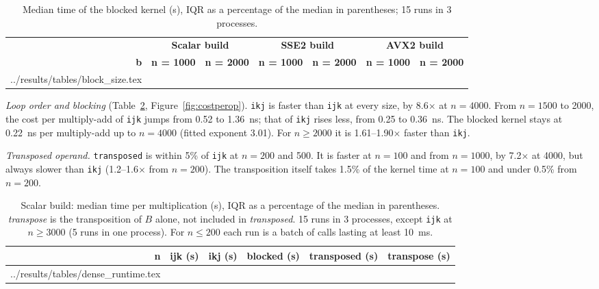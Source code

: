 \documentclass[11pt,a4paper]{article}
\makeatletter
\newcommand{\tableinput}[1]{\@@input #1 }
\makeatother
\begin{document}
\begin{table}[H]
\centering
\footnotesize
\setlength{\tabcolsep}{4pt}
\begin{tabular}{rllllll}
\toprule
& \multicolumn{2}{c}{\textbf{Scalar build}} & \multicolumn{2}{c}{\textbf{SSE2 build}} &
\multicolumn{2}{c}{\textbf{AVX2 build}} \\
\cmidrule(lr){2-3} \cmidrule(lr){4-5} \cmidrule(lr){6-7}
\textbf{b} & \textbf{n = 1000} & \textbf{n = 2000} & \textbf{n = 1000} & \textbf{n = 2000} &
\textbf{n = 1000} & \textbf{n = 2000} \\
\midrule
\tableinput{../results/tables/block_size.tex}
\bottomrule
\end{tabular}
\caption{Median time of the blocked kernel (s), IQR as a percentage of the median in
parentheses; 15 runs in 3 processes.}
\label{tab:blocksize}
\end{table}

\textit{Loop order and blocking} (Table~\ref{tab:dense}, Figure~\ref{fig:costperop}).
\texttt{ikj} is faster than \texttt{ijk} at every size, by 8.6$\times$ at $n = 4000$. From
$n = 1500$ to 2000, the cost per multiply-add of \texttt{ijk} jumps from 0.52 to 1.36~ns;
that of \texttt{ikj} rises less, from 0.25 to 0.36~ns. The blocked kernel stays at 0.22~ns
per multiply-add up to $n = 4000$ (fitted exponent 3.01). For $n \ge 2000$ it is
1.61--1.90$\times$ faster than \texttt{ikj}.

\textit{Transposed operand.} \texttt{transposed} is within 5\% of \texttt{ijk} at
$n = 200$ and 500. It is faster at $n = 100$ and from $n = 1000$, by 7.2$\times$ at 4000,
but always slower than \texttt{ikj} (1.2--1.6$\times$ from $n = 200$). The transposition
itself takes 1.5\% of the kernel time at $n = 100$ and under 0.5\% from $n = 200$.

\begin{table}[H]
\centering
\footnotesize
\setlength{\tabcolsep}{2.5pt}
\begin{tabular}{rlllll}
\toprule
\textbf{n} & \textbf{ijk (s)} & \textbf{ikj (s)} & \textbf{blocked (s)} &
\textbf{transposed (s)} & \textbf{transpose (s)} \\
\midrule
\tableinput{../results/tables/dense_runtime.tex}
\bottomrule
\end{tabular}
\caption{Scalar build: median time per multiplication (s), IQR as a percentage of the
median in parentheses. \textit{transpose} is the transposition of $B$ alone, not included in
\textit{transposed}. 15 runs in 3 processes, except \texttt{ijk} at $n \ge 3000$ (5 runs in
one process). For $n \le 200$ each run is a batch of calls lasting at least 10~ms.}
\label{tab:dense}
\end{table}
\end{document}
